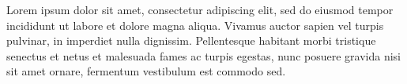 \documentclass[11pt]{article}
\begin{document}
\pagestyle{empty}
\raggedright
{}


\vspace{1em}

Lorem ipsum dolor sit amet, consectetur adipiscing elit, sed do eiusmod tempor incididunt ut labore et dolore magna aliqua. 
Vivamus auctor sapien vel turpis pulvinar, in imperdiet nulla dignissim. 
Pellentesque habitant morbi tristique senectus et netus et malesuada fames ac turpis egestas, nunc posuere gravida nisi sit amet ornare, fermentum vestibulum est commodo sed.
\vspace{1em}



\vspace{0.5em}




\vspace{1em}



\end{document}

